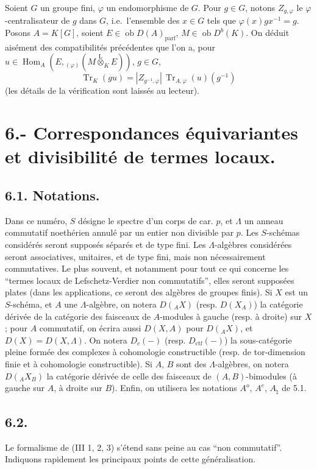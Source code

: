 \documentclass[11pt]{article}
\DeclareMathOperator{\Hom}{Hom}
\newcommand{\ob}{\operatorname{ob}}
\providecommand{\Tr}{\operatorname{Tr}}
\providecommand{\Tr}{\operatorname{Tr}}
\providecommand{\lten}{\overset{\mathrm L}{\otimes}}
\providecommand{\Tr}{\operatorname{Tr}}
\providecommand{\Hom}{\operatorname{Hom}}
\providecommand{\ob}{\operatorname{ob}}
\providecommand{\lten}{\overset{\mathrm L}{\otimes}}
\providecommand{\lten}{\overset{\mathrm L}{\otimes}}
\providecommand{\Tr}{\operatorname{Tr}}
\providecommand{\lten}{\overset{\mathrm L}{\otimes}}
\providecommand{\lten}{\overset{\mathrm L}{\otimes}}
\providecommand{\lten}{\overset{\mathrm L}{\otimes}}
\providecommand{\Hom}{\operatorname{Hom}}
\providecommand{\Tr}{\operatorname{Tr}}
\providecommand{\lten}{\overset{\mathrm L}{\otimes}}
\begin{document}
Soient $G$ un groupe fini, $\varphi$ un endomorphisme de $G$. Pour $g\in G$, notons $Z_{g,\varphi}$ le $\varphi$-centralisateur de $g$ dans $G$, i.e.~l'ensemble des $x\in G$ tels que $\varphi(x)gx^{-1}=g$. Posons $A=K[G]$, soient $E\in\ob D(A)_{\mathrm{parf}}$, $M\in\ob D^b(K)$. On déduit aisément des compatibilités précédentes que l'on a, pour $u\in\Hom_A(E,{}_{(\varphi)}(M\lten_KE))$, $g\in G$,
\begin{equation}\tag{5.13.5}
\Tr_K(gu)=|Z_{g^{-1},\varphi}|\,\Tr_{A,\varphi}(u)(g^{-1})
\end{equation}
(les détails de la vérification sont laissés au lecteur).

\section*{6.- Correspondances équivariantes et divisibilité de termes locaux.}

\subsection*{6.1. Notations.}

Dans ce numéro, $S$ désigne le spectre d'un corps de car. $p$, et $\Lambda$ un anneau commutatif noethérien annulé par un entier non divisible par $p$. Les $S$-schémas considérés seront supposés séparés et de type fini. Les $\Lambda$-algèbres considérées seront associatives, unitaires, et de type fini, mais non nécessairement commutatives. Le plus souvent, et notamment pour tout ce qui concerne les ``termes locaux de Lefschetz-Verdier non commutatifs'', elles seront supposées plates (dans les applications, ce seront des algèbres de groupes finis). Si $X$ est un $S$-schéma, et $A$ une $\Lambda$-algèbre, on notera $D({}_AX)$ (resp. $D(X_A)$) la catégorie dérivée de la catégorie des faisceaux de $A$-modules à gauche (resp. à droite) sur $X$; pour $A$ commutatif, on écrira aussi $D(X,A)$ pour $D({}_AX)$, et $D(X)=D(X,\Lambda)$. On notera $D_c(-)$ (resp. $D_{\mathrm{ctf}}(-)$) la sous-catégorie pleine formée des complexes à cohomologie constructible (resp. de tor-dimension finie et à cohomologie constructible). Si $A$, $B$ sont des $\Lambda$-algèbres, on notera $D({}_AX_B)$ la catégorie dérivée de celle des faisceaux de $(A,B)$-bimodules (à gauche sur $A$, à droite sur $B$). Enfin, on utilisera les notations $A^o$, $A^e$, $A_{\natural}$ de 5.1.

\subsection*{6.2.}
Le formalisme de (III 1, 2, 3) s'étend sans peine au cas ``non commutatif''. Indiquons rapidement les principaux points de cette généralisation.
\end{document}
